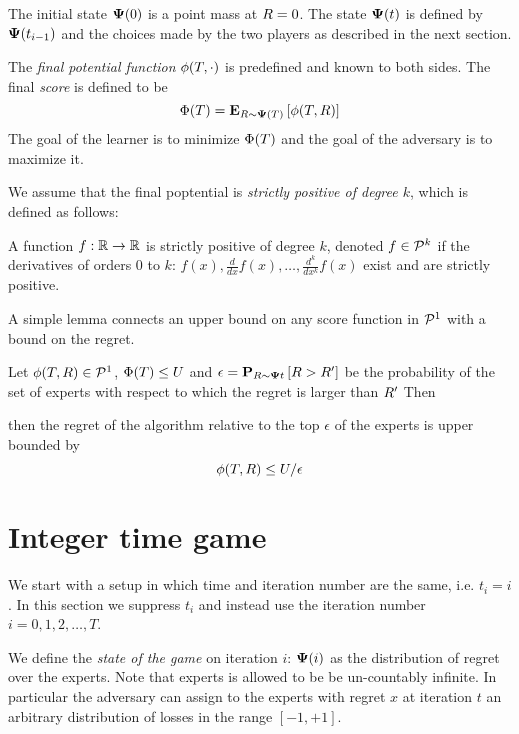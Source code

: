 \documentclass[12pt]{article} %
\begin{document}
The initial state ${\bf \Psi}(0)$ is a point mass at $R=0$. 
The state ${\bf \Psi}(t)$ is defined by ${\bf \Psi}(t_{i-1})$ and the choices made
by the two players as described in the next section.

The {\em final potential function} $\phi(T,\cdot)$ is predefined and
known to both sides. The final {\em score} is defined to be
\begin{equation} \label{eqn:FinalExpectedValue}
  \Phi(T) ={\bf E}_{R \sim {\bf \Psi}(T)}\left[ \phi(T,R) \right]
\end{equation}
The goal of the learner is to minimize $\Phi(T)$ and the goal of
the adversary is to maximize it.

We assume that the final poptential is {\em strictly positive of degree $k$}, which is defined as follows:
\begin{definition}
A function $f:\mathbb{R} \to \mathbb{R}$ is strictly positive of degree $k$, 
denoted $f \in {\cal P}^{k}$ if the derivatives of orders 0 to $k$:  
$f(x), \frac{d}{dx}f(x), \ldots, \frac{d^k}{dx^k}f(x)$ exist and are strictly positive.
\end{definition}

A simple lemma connects an upper bound on any score function in ${\cal P}^{1}$ with a bound on the regret.
\begin{lemma}
Let $\phi(T,R) \in {\cal P}^{1}$, $\Phi(T) \leq U$ and $\epsilon={\bf P}_{R \sim
  {\bf \Psi}{t}}\left[ R >R' \right]$ be the probability of the set of experts with
respect to which the regret is larger than $R'$ Then

then the regret of the algorithm relative 
to the top $\epsilon$ of the experts is upper bounded by
\[
  \phi(T,R) \leq U/\epsilon
\]
\end{lemma}

\section{Integer time game} \label{sec:integer}
We start with a setup in which time and iteration number are the same, i.e.
$t_i=i$. In this section we suppress $t_i$ and instead use the
iteration number $i=0,1,2,\ldots,T$.

We define the {\em state of the game} on iteration $i$: ${\bf \Psi}(i)$ as
the distribution of regret over the experts.
Note that experts is allowed to be be un-countably infinite. In particular the
adversary can assign to the experts with regret $x$ at iteration $t$
an arbitrary distribution of losses in the range $[-1,+1]$.
\end{document}

